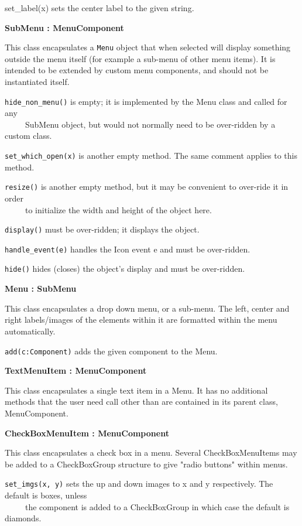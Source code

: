 set\_label(x) sets the center label to the given string.

{\ttfamily\bfseries
{}SubMenu : MenuComponent}

This class encapsulates a \texttt{Menu} object that when selected will
display something outside the menu itself (for example a sub-menu of
other menu items). It is intended to be extended by custom menu
components, and should not be instantiated itself.

\texttt{hide\_non\_menu()} is empty; it is implemented by the Menu class and
called for any\\
 \ \ \ \ \ SubMenu object, but would not normally need to be over-ridden
by a custom class.

\texttt{set\_which\_open(x)} is another empty method. The same comment applies to
this method.

\texttt{resize()} is another empty method, but it may be convenient to over-ride
it in order\\
 \ \ \ \ \ to initialize the width and height of the object here.

\texttt{display()} must be over-ridden; it displays the object.

\texttt{handle\_event(e)} handles the Icon event e and must be over-ridden.

\texttt{hide()} hides (closes) the object's display and must be
over-ridden.

{\ttfamily\bfseries
{}Menu : SubMenu}

This class encapsulates a drop down menu, or a sub-menu. The left,
center and right labels/images of the elements within it are formatted
within the menu automatically.

\texttt{add(c:Component)} adds the given component to the Menu.

{\ttfamily\bfseries
TextMenuItem : MenuComponent}

This class encapsulates a single text item in a Menu. It has no
additional methods that the user need call other than are contained in
its parent class, MenuComponent.

{\ttfamily\bfseries
{}CheckBoxMenuItem : MenuComponent}

This class encapsulates a check box in a menu. Several CheckBoxMenuItems
may be added to a CheckBoxGroup structure to give "radio
buttons" within menus.

\texttt{set\_imgs(x, y)} sets the up and down images to x and y respectively.
The default is boxes, unless\\
 \ \ \ \ \ the component is added to a CheckBoxGroup in which case the
default is diamonds.

